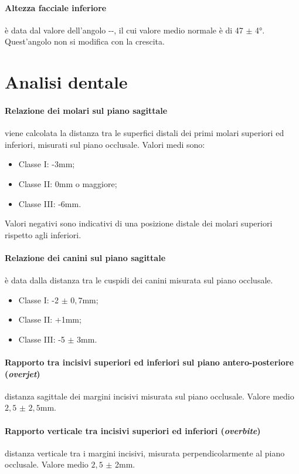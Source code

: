 \paragraph{Altezza facciale inferiore} è data dal valore dell'angolo --, il cui valore medio normale è di 47 $\pm$ 4°. Quest'angolo non si modifica con la crescita.

\section{Analisi dentale}

\paragraph{Relazione dei molari sul piano sagittale} viene calcolata la distanza tra le superfici distali dei primi molari superiori ed inferiori, misurati sul piano occlusale. Valori medi sono:
\begin{itemize}
\item Classe I: -3mm;
\item Classe II: 0mm o maggiore;
\item Classe III: -6mm.
\end{itemize}

Valori negativi sono indicativi di una posizione distale dei molari superiori rispetto agli inferiori.

\paragraph{Relazione dei canini sul piano sagittale} è data dalla distanza tra le cuspidi dei canini misurata sul piano occlusale.
\begin{itemize}
\item Classe I: -2 $\pm$ $0,7$mm;
\item Classe II: +1mm;
\item Classe III: -5 $\pm$ 3mm.
\end{itemize}

\paragraph{Rapporto tra incisivi superiori ed inferiori sul piano antero-posteriore (\textit{overjet})} distanza sagittale dei margini incisivi misurata sul piano occlusale. Valore medio $2,5$ $\pm$ $2,5$mm.

\paragraph{Rapporto verticale tra incisivi superiori ed inferiori (\textit{overbite})} distanza verticale tra i margini incisivi, misurata perpendicolarmente al piano occlusale. Valore medio $2,5$ $\pm$ 2mm.

